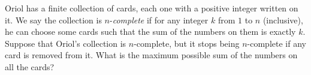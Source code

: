 Oriol has a finite collection of cards, each one with a positive integer written on it. We say the collection is $n$-\textit{complete} if for any integer $k$ from $1$ to $n$ (inclusive), he can choose some cards such that the sum of the numbers on them is exactly $k$. Suppose that Oriol's collection is $n$-complete, but it stops being $n$-complete if any card is removed from it. What is the maximum possible sum of the numbers on all the cards?


